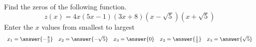 \documentclass{ximera}
\author{David Kish}
\begin{document}
\begin{exercise}
Find the zeros of the following function.
\[
z(x)=4x(5x-1)(3x+8)(x-\sqrt{5})(x+\sqrt{5})
\]
Enter the $x$ values from smallest to largest
\[
\begin{array}{ccccc}

x_1 = \answer{-\frac{8}{3}} & x_2  = \answer{-\sqrt{5}} & x_3 = \answer{0} & x_2  = \answer{\frac{1}{5}} & x_3 = \answer{\sqrt{5}}
\end{array}
\]

\end{exercise}
\end{document}
